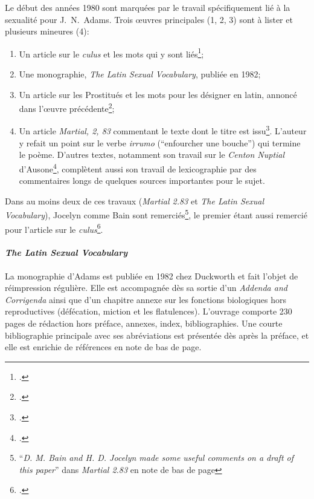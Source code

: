 Le début des années 1980 sont marquées par le travail spécifiquement lié à la sexualité pour J.~N.~Adams. Trois œuvres principales (1, 2, 3) sont à lister et plusieurs mineures (4):
\begin{enumerate}
    \item Un article sur le \textit{culus} et les mots qui y sont liés\footcite{adams_culus_1981};
    \item Une monographie, \textit{The Latin Sexual Vocabulary}, publiée en 1982;
    \item Un article sur les Prostitués et les mots pour les désigner en latin, annoncé dans l'œuvre précédente\footcite{adams_prostitute};
    \item Un article \textit{Martial, 2, 83} commentant le texte dont le titre est issu\footcite{adams_martial_1983}. L'auteur y refait un point sur le verbe \textit{irrumo} (\enquote{enfourcher une bouche}) qui termine le poème. D'autres textes, notamment son travail sur le \textit{Centon Nuptial} d'Ausone\footcite{adams1981ausonius}, complètent aussi son travail de lexicographie par des commentaires longs de quelques sources importantes pour le sujet.
\end{enumerate}
Dans au moins deux de ces travaux (\textit{Martial 2.83} et \textit{The Latin Sexual Vocabulary}), Jocelyn comme Bain sont remerciés\footnote{\enquote{\textit{D. M. Bain and H. D. Jocelyn made some useful comments on a draft of this paper}} dans \textit{Martial 2.83} en note de bas de page}, le premier étant aussi remercié pour l'article sur le \textit{culus}\footcite[p.~264]{adams_culus_1981}. 

\paragraph{\textit{The Latin Sexual Vocabulary}}

La monographie d'Adams est publiée en 1982 chez Duckworth et fait l'objet de réimpression régulière. Elle est accompagnée dès sa sortie d'un \textit{Addenda and Corrigenda} ainsi que d'un chapitre annexe sur les fonctions biologiques hors reproductives (défécation, miction et les flatulences). L'ouvrage comporte 230 pages de rédaction hors préface, annexes, index, bibliographies. Une courte bibliographie principale avec ses abréviations est présentée dès après la préface, et elle est enrichie de références en note de bas de page.

